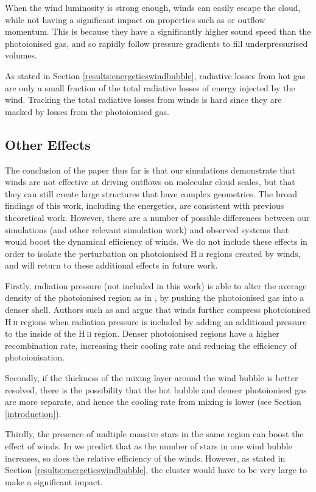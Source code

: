 \documentclass[a4paper,fleqn,usenatbib]{mnras}
\newcommand{\HII}{H$~$\textsc{ii}\xspace}
\begin{document}
When the wind luminosity is strong enough, winds can easily escape the cloud, while not having a significant impact on properties such as \SFE or outflow momentum. This is because they have a significantly higher sound speed than the photoionised gas, and so rapidly follow pressure gradients to fill underpressurised volumes.

As stated in Section \ref{results:energeticswindbubble}, radiative losses from hot gas are only a small fraction of the total radiative losses of energy injected by the wind. Tracking the total radiative losses from winds is hard since they are masked by losses from the photoionised gas.

\subsection{Other Effects}
\label{effective:intheend}

The conclusion of the paper thus far is that our simulations demonstrate that winds are not effective at driving outflows on molecular cloud scales, but that they can still create large structures that have complex geometries. The broad findings of this work, including the energetics, are consistent with previous theoretical work. However, there are a number of possible differences between our simulations (and other relevant simulation work) and observed systems that would boost the dynamical efficiency of winds. We do not include these effects in order to isolate the perturbation on photoionised \HII regions created by winds, and will return to these additional effects in future work.

Firstly, radiation pressure (not included in this work) is able to alter the average density of the photoionised region as in \cite{Draine2011}, by pushing the photoionised gas into a denser shell. Authors such as \cite{Pellegrini2007} and \cite{Yeh2012} argue that winds further compress photoionised \HII regions when radiation pressure is included by adding an additional pressure to the inside of the \HII region. Denser photoionised regions have a higher recombination rate, increasing their cooling rate and reducing the efficiency of photoionisation.

Secondly, if the thickness of the mixing layer around the wind bubble is better resolved, there is the possibility that the hot bubble and denser photoionised gas are more separate, and hence the cooling rate from mixing is lower (see Section \ref{introduction}).

Thirdly, the presence of multiple massive stars in the same region can boost the effect of winds. In \cite{Geen2019} we predict that as the number of stars in one wind bubble increases, so does the relative efficiency of the winds. However, as stated in Section \ref{results:energeticswindbubble}, the cluster would have to be very large to make a significant impact.
\end{document}
